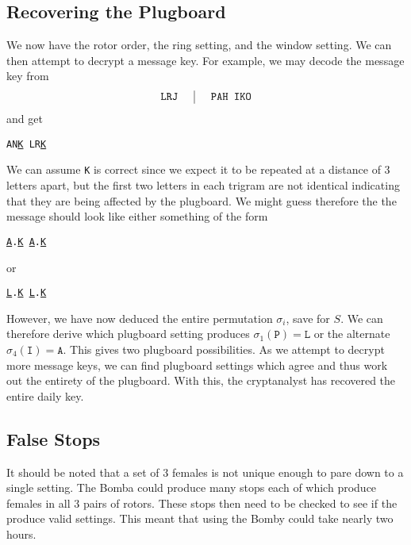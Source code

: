 \subsection{Recovering the Plugboard} \label{bomba_plugboard}
We now have the rotor order, the ring setting, and the window
setting. We can then attempt to decrypt a message key. For example,
we may decode the message key from
\[
	\setlength{\arraycolsep}{15pt}
	\begin{array}{c | c}
		\texttt{LRJ} & \texttt{PAH }\texttt{IKO} \\
	\end{array}
\]
and get
\begin{center}
	\texttt{AN}{\uline{\texttt{K}}}\texttt{ LR}{\uline{\texttt{K}}}
\end{center}
We can assume \texttt{K} is correct since we expect it to be repeated
at a distance of 3 letters apart, but the first two letters in each
trigram are not identical indicating that they are being affected by
the plugboard. We might guess therefore the the message should look
like either something of the form
\begin{center}
	{\uline{\texttt{A}}}\texttt{.}{\uline{\texttt{K}}}\texttt{
	}{\uline{\texttt{A}}}\texttt{.}{\uline{\texttt{K}}}
\end{center}
or
\begin{center}
	{\uline{\texttt{L}}}\texttt{.}{\uline{\texttt{K}}}\texttt{
	}{\uline{\texttt{L}}}\texttt{.}{\uline{\texttt{K}}}
\end{center}

\noindent However, we have now deduced the entire permutation
$\sigma_i$, save for $S$. We can therefore derive which plugboard
setting produces $\sigma_1(\texttt{P}) = \texttt{L}$ or the
alternate $\sigma_4(\texttt{I}) = \texttt{A}$. This gives two
plugboard possibilities. As we attempt to decrypt more message keys,
we can find plugboard settings which agree and thus work out the
entirety of the plugboard. With this, the cryptanalyst has recovered
the entire daily key.
\subsection{False Stops}
It should be noted that a set of $3$ females is not unique enough to
pare down to a single setting. The Bomba could produce many stops
each of which produce females in all $3$ pairs of rotors. These stops
then need to be checked to see if the produce valid settings. This
meant that using the Bomby could take nearly two hours.

